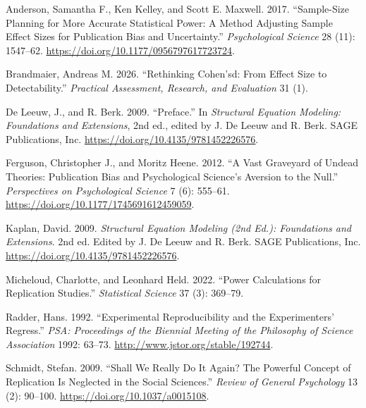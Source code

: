 \documentclass[
  12pt,
  letterpaper,
  man]{apa7}
\newlength{\cslhangindent}
\newenvironment{CSLReferences}[2] %
 {\begin{list}{}{%
  \setlength{\itemindent}{0pt}
  \setlength{\leftmargin}{0pt}
  \setlength{\parsep}{0pt}
  \ifodd #1
   \setlength{\leftmargin}{\cslhangindent}
   \setlength{\itemindent}{-1\cslhangindent}
  \fi
  \setlength{\itemsep}{#2\baselineskip}}}
 {\end{list}}
\begin{document}
\protect{}\label{refs}
\begin{CSLReferences}{1}{1}
Anderson, Samantha F., Ken Kelley, and Scott E. Maxwell. 2017.
{``Sample-Size Planning for More Accurate Statistical Power: A Method
Adjusting Sample Effect Sizes for Publication Bias and Uncertainty.''}
\emph{Psychological Science} 28 (11): 1547--62.
\url{https://doi.org/10.1177/0956797617723724}.

Brandmaier, Andreas M. 2026. {``Rethinking Cohen'sd: From Effect Size to
Detectability.''} \emph{Practical Assessment, Research, and Evaluation}
31 (1).

De Leeuw, J., and R. Berk. 2009. {``{Preface}.''} In \emph{Structural
Equation Modeling: Foundations and Extensions}, 2nd ed., edited by J. De
Leeuw and R. Berk. SAGE Publications, Inc.
\url{https://doi.org/10.4135/9781452226576}.

Ferguson, Christopher J., and Moritz Heene. 2012. {``A Vast Graveyard of
Undead Theories: Publication Bias and Psychological Science's Aversion
to the Null.''} \emph{Perspectives on Psychological Science} 7 (6):
555--61. \url{https://doi.org/10.1177/1745691612459059}.

Kaplan, David. 2009. \emph{Structural {Equation} {Modeling} (2nd Ed.):
{Foundations} and {Extensions}}. 2nd ed. Edited by J. De Leeuw and R.
Berk. SAGE Publications, Inc.
\url{https://doi.org/10.4135/9781452226576}.

Micheloud, Charlotte, and Leonhard Held. 2022. {``Power Calculations for
Replication Studies.''} \emph{Statistical Science} 37 (3): 369--79.

Radder, Hans. 1992. {``Experimental Reproducibility and the
Experimenters' Regress.''} \emph{PSA: Proceedings of the Biennial
Meeting of the Philosophy of Science Association} 1992: 63--73.
\url{http://www.jstor.org/stable/192744}.

Schmidt, Stefan. 2009. {``Shall We {Really} Do It {Again}? {The}
{Powerful} {Concept} of {Replication} Is {Neglected} in the {Social}
{Sciences}.''} \emph{Review of General Psychology} 13 (2): 90--100.
\url{https://doi.org/10.1037/a0015108}.

\end{CSLReferences}
\end{document}
